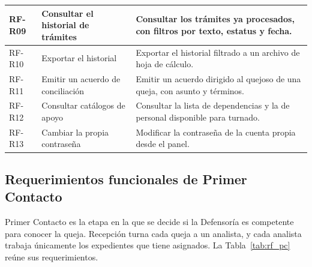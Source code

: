 \begin{longtable}{|p{1.5cm}|p{3.6cm}|p{9.0cm}|}
		RF-R09 & Consultar el historial de trámites & Consultar los trámites ya procesados, con
		filtros por texto, estatus y fecha. \\ \hline
	
		RF-R10 & Exportar el historial & Exportar el historial filtrado a un archivo de hoja de
		cálculo. \\ \hline
	
		RF-R11 & Emitir un acuerdo de conciliación & Emitir un acuerdo dirigido al quejoso de una
		queja, con asunto y términos. \\ \hline
	
		RF-R12 & Consultar catálogos de apoyo & Consultar la lista de dependencias y la de personal
		disponible para turnado. \\ \hline
	
		RF-R13 & Cambiar la propia contraseña & Modificar la contraseña de la cuenta propia desde el
		panel. \\ \hline
	\end{longtable}
	
	\normalsize
	
	\subsection{Requerimientos funcionales de Primer Contacto}
	Primer Contacto es la etapa en la que se decide si la Defensoría es competente para conocer la
	queja. Recepción turna cada queja a un analista, y cada analista trabaja únicamente los
	expedientes que tiene asignados. La Tabla~\ref{tab:rf_pc} reúne sus requerimientos.

	\small
	\renewcommand{\arraystretch}{1.2}

